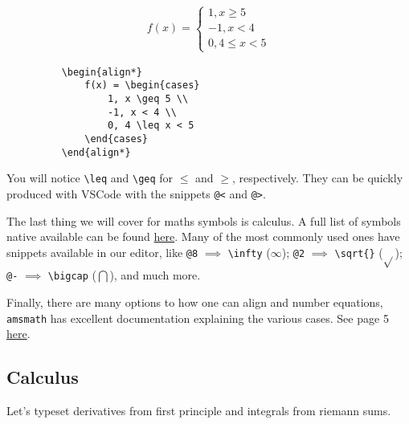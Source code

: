 \begin{figure}[h]
	\begin{minipage}{0.45\textwidth}
    \begin{align*}
        f(x) = \begin{cases}
            1, x \geq 5 \\
            -1, x < 4 \\
            0, 4 \leq x < 5  
        \end{cases}
    \end{align*}
\end{minipage}
\begin{minipage}{0.45\textwidth}
    \begin{lstlisting}
    \begin{align*}
        f(x) = \begin{cases}
            1, x \geq 5 \\
            -1, x < 4 \\
            0, 4 \leq x < 5  
        \end{cases}
    \end{align*}
    \end{lstlisting}
\end{minipage}
\end{figure}

You will notice \verb|\leq| and \verb|\geq| for \( \leq \) and \( \geq \), respectively.
They can be quickly produced with VSCode with the snippets \verb|@<| and \verb|@>|.

The last thing we will cover for maths symbols is calculus.
A full list of symbols native available can be found \href{https://oeis.org/wiki/List_of_LaTeX_mathematical_symbols}{here}.
Many of the most commonly used ones have snippets available in our editor, like \verb|@8| \( \implies \) \verb|\infty| (\( \infty\)); \verb|@2| \( \implies \) \verb|\sqrt{}| (\(\sqrt{} \)); \verb|@-| \( \implies \) \verb|\bigcap| (\( \bigcap \)), and much more.

Finally, there are many options to how one can align and number equations, \texttt{amsmath} has excellent documentation explaining the various cases.
See page 5 \href{https://anorien.csc.warwick.ac.uk/mirrors/CTAN/macros/latex/required/amsmath/amsldoc.pdf}{here}.

\subsection{Calculus}
Let's typeset derivatives from first principle and integrals from riemann sums.


